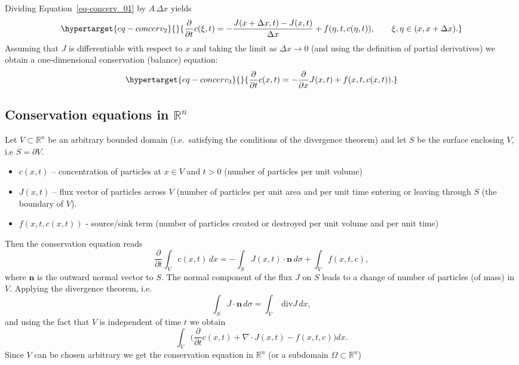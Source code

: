\documentclass[
  letterpaper,
  DIV=11,
  numbers=noendperiod]{scrreprt}
\providecommand{\tightlist}{%
  \setlength{\itemsep}{0pt}\setlength{\parskip}{0pt}}\usepackage{longtable,booktabs,array}
\theoremstyle{definition}
\theoremstyle{plain}
\theoremstyle{plain}
\theoremstyle{remark}
\begin{document}
Dividing Equation~\ref{eq-concerv_01} by \(A \, \Delta x\) yields
\begin{equation}\protect\hypertarget{eq-concerv_2}{}{
\frac{\partial}{\partial t} c(\xi, t)  = - \frac  {J(x+\Delta x,t ) - J(x,t)} { \Delta x} + f(\eta,t,c(\eta, t)), \qquad \xi, \eta \in (x, x+ \Delta x).
}\label{eq-concerv_2}\end{equation} Assuming that \(J\) is
differentiable with respect to \(x\) and taking the limit as
\(\Delta x \to 0\) (and using the definition of partial derivatives) we
obtain a one-dimensional conservation (balance) equation:
\begin{equation}\protect\hypertarget{eq-concerv_3}{}{
\frac{\partial}{\partial t} c(x,t)  = - \frac  {\partial} { \partial x} J(x,t) + f(x,t ,c(x,t)).
}\label{eq-concerv_3}\end{equation}

\hypertarget{conservation-equations-in-mathbb-rn}{%
\subsection{\texorpdfstring{Conservation equations in
\(\mathbb R^n\)}{Conservation equations in \textbackslash mathbb R\^{}n}}\label{conservation-equations-in-mathbb-rn}}

Let \(V \subset \mathbb R^n\) be an arbitrary bounded domain
(i.e.~satisfying the conditions of the divergence theorem) and let \(S\)
be the surface enclosing \(V\), i.e \(S = \partial V\).

\begin{itemize}
\tightlist
\item
  \(c(x,t)\) -- concentration of particles at \(x\in V\) and \(t>0\)
  (number of particles per unit volume)
\item
  \(J(x,t)\) -- flux vector of particles across \(V\) (number of
  particles per unit area and per unit time entering or leaving through
  \(S\) (the boundary of \(V\)).
\item
  \(f(x,t ,c(x,t))\) - source/sink term (number of particles created or
  destroyed per unit volume and per unit time)
\end{itemize}

Then the conservation equation reads \[
\frac{\partial}{\partial t} \int_V c(x,t) \, dx = - \int_{S} J(x,t) \cdot {\mathbf{n}} \, d\sigma + \int_V f(x,t ,c), 
\] where \(\mathbf{n}\) is the outward normal vector to \(S\). The
normal component of the flux \(J\) on \(S\) leads to a change of number
of particles (of mass) in \(V\). Applying the divergence theorem, i.e.
\[
\int_S J \cdot {\mathbf{n}} \, d\sigma = \int_V \text{ div} J \, dx,
\] and using the fact that \(V\) is independent of time \(t\) we obtain
\[
 \int_V \Big(\frac{\partial}{\partial t} c(x,t) + \nabla \cdot  J(x,t) -  f(x,t ,c)\Big) dx.
\] Since \(V\) can be chosen arbitrary we get the conservation equation
in \(\mathbb R^n\) (or a subdomain \(\Omega \subset \mathbb R^n\))
\end{document}
